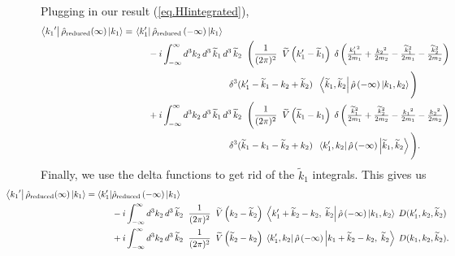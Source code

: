 \documentclass[11pt]{article}
\newcommand{\bra}[1]{\left\langle#1\right|}
\newcommand{\ket}[1]{\left|#1\right\rangle}
\newcommand{\op}[1]{\hat{#1}}
\theoremstyle{theorem}
\theoremstyle{remark}
\theoremstyle{step}
\theoremstyle{gap}
\begin{document}
Plugging in our result (\ref{eq.HIintegrated}),
\begin{align*}
\bra{{k_1}^\prime}\op{\rho}_\text{reduced}(\infty)\ket{k_1}
=\hspace{1.7em}&\hspace{-1.5em}
\bra{k_1^\prime}\op{\rho}_\text{reduced}\left(-\infty\right)\ket{k_1}
\\&-  i \int_{-\infty}^\infty d^3k_2 \,d^3\,\widetilde{k}_1\,d^3\,\widetilde{k}_2 \;\;{\Bigg(}\frac{1}{(2\pi)^2}\; \;\widetilde{V}\left(k_1^\prime - \widetilde{k}_1\right)\;\delta\left({\textstyle\frac{{k_1^\prime}^2}{2m_1} + \frac{{k_2}^2}{2m_2} - \frac{{\widetilde{k}_1}^2}{2m_1} - \frac{{\widetilde{k}_2}^2}{2m_2}}\right) \\&\hspace{9em}\delta^3(k_1^\prime - \widetilde{k}_1 - k_2 + \widetilde{k}_2)    \;\;\bra{\widetilde{k}_1, \widetilde{k}_2}\op{\rho}\left(-\infty\right)\ket{k_1, k_2}{\Bigg)}
\\&+  i \int_{-\infty}^\infty d^3k_2 \,d^3\,\widetilde{k}_1\,d^3\,\widetilde{k}_2 \;\;{\Bigg(}\frac{1}{(2\pi)^2}\; \;\widetilde{V}\left(\widetilde{k}_1 - {k}_1\right)\;\delta\left({\textstyle\frac{{\widetilde{k}_1}^2}{2m_1} + \frac{{\widetilde{k}_2}^2}{2m_2} - \frac{{{k}_1}^2}{2m_1} - \frac{{{k}_2}^2}{2m_2}}\right) \\&\hspace{9em}\delta^3(\widetilde{k}_1 - {k}_1 - \widetilde{k}_2 + {k}_2)    \;\;\bra{{k}_1^\prime, {k}_2}\op{\rho}\left(-\infty\right)\ket{\widetilde{k}_1, \widetilde{k}_2}{\Bigg)}.
\end{align*}
Finally, we use the delta functions to get rid of the \(\widetilde{k}_1\) integrals. This gives us
\begin{align*}
\hspace{-4em}\bra{{k_1}^\prime}\op{\rho}_\text{reduced}(\infty)\ket{k_1}
= 
\bra{k_1^\prime}&\op{\rho}_\text{reduced}\left(-\infty\right)\ket{k_1} \\
&-  i \int_{-\infty}^\infty d^3k_2 \,d^3\,\widetilde{k}_2 \;\;\frac{1}{(2\pi)^2}\; \;\widetilde{V}\left(k_2 - 
\widetilde{k}_2\right)\; \bra{k_1^\prime + \widetilde{k}_2 - k_2,\; \widetilde{k}_2}\op{\rho}\left(-\infty\right)\ket{k_1, k_2} \;D(k_1^\prime, k_2, \widetilde{k}_2)
\nonumber\\&+  i \int_{-\infty}^\infty d^3k_2 \,d^3\,\widetilde{k}_2 \;\;\frac{1}{(2\pi)^2}\; \;\widetilde{V}\left(\widetilde{k}_2 - 
{k}_2\right)\; \bra{{k}_1^\prime, {k}_2}\op{\rho}\left(-\infty\right)\ket{k_1 + \widetilde{k}_2 - k_2,\; \widetilde{k}_2} \;D(k_1, k_2, \widetilde{k}_2). \nonumber
\end{align*}
\end{document}
